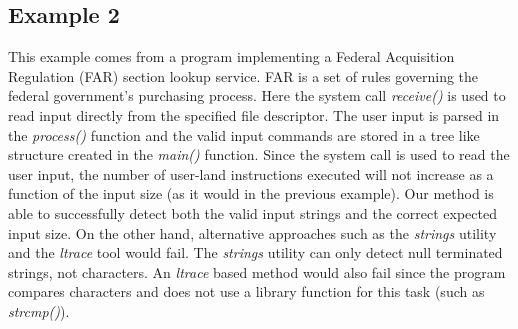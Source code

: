 \documentclass{acm_proc_article-sp}
\begin{document}
\lstset{style=mystyle}
 


\subsection{Example 2}
This example comes from a program implementing a Federal Acquisition Regulation (FAR) section lookup service.
FAR is a set of rules governing the federal government's purchasing process.
Here the system call \textit{receive()} is used to read input directly from the specified file descriptor.
The user input is parsed in the \textit{process()} function and the valid input commands are stored in a tree like structure created in the \textit{main()} function.
Since the system call is used to read the user input, the number of user-land instructions executed will not increase as a function of the input size (as it would in the previous example).
Our method is able to successfully detect both the valid input strings and the correct expected input size.
On the other hand, alternative approaches such as the \textit{strings} utility and the \textit{ltrace} tool would fail.
The \textit{strings} utility can only detect null terminated strings, not characters.
An \textit{ltrace} based method would also fail since the program compares characters and does not use a library function for this task (such as \textit{strcmp()}).



\end{document}
